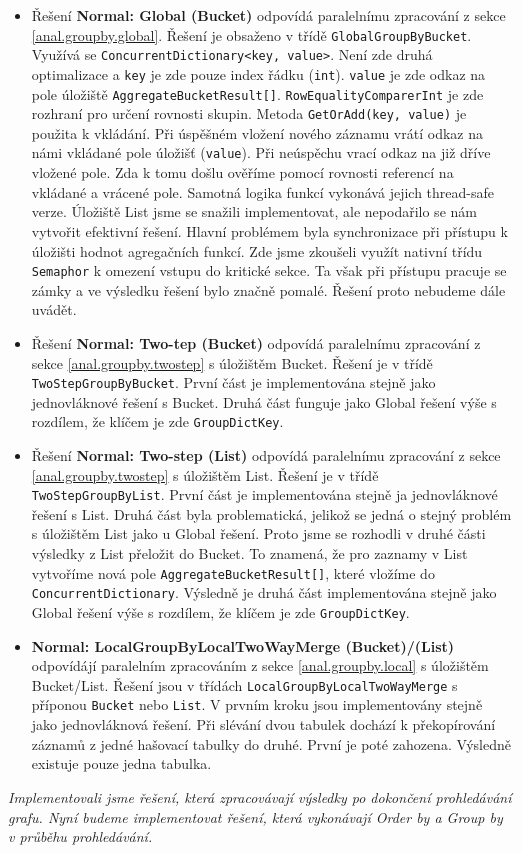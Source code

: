 \begin{itemize}
\item Řešení \textbf{Normal: Global (Bucket)} odpovídá paralelnímu zpracování z sekce \ref{anal.groupby.global}.
Řešení je obsaženo v třídě \texttt{GlobalGroupByBucket}.
Využívá se \texttt{ConcurrentDictionary<key, value>}.
Není zde druhá optimalizace a \texttt{key} je zde pouze index řádku (\texttt{int}). 
\texttt{value} je zde odkaz na pole úložiště \texttt{AggregateBucketResult[]}.
\texttt{RowEqualityComparerInt} je zde rozhraní pro určení rovnosti skupin.
Metoda \texttt{GetOrAdd(key, value)} je použita k vkládání.
Při úspěšném vložení nového záznamu vrátí odkaz na námi vkládané pole úložišť (\texttt{value}).
Při neúspěchu vrací odkaz na již dříve vložené pole.
Zda k tomu došlu ověříme pomocí rovnosti referencí na vkládané a vrácené pole. 
Samotná logika funkcí vykonává jejich thread-safe verze. 
Úložiště List jsme se snažili implementovat, ale nepodařilo se nám vytvořit efektivní řešení.
Hlavní problémem byla synchronizace při přístupu k úložišti hodnot agregačních funkcí.
Zde jsme zkoušeli využít nativní třídu \texttt{Semaphor} k omezení vstupu do kritické sekce.
Ta však při přístupu pracuje se zámky a ve výsledku řešení bylo značně pomalé.
Řešení proto nebudeme dále uvádět.

\item Řešení \textbf{Normal: Two-tep (Bucket)} odpovídá paralelnímu zpracování z sekce \ref{anal.groupby.twostep} s úložištěm Bucket.
Řešení je v třídě \texttt{TwoStepGroupByBucket}.
První část je implementována stejně jako jednovláknové řešení s Bucket.
Druhá část funguje jako Global řešení výše s rozdílem, že klíčem je zde \texttt{GroupDictKey}.

\item Řešení \textbf{Normal: Two-step (List) }odpovídá paralelnímu zpracování z sekce \ref{anal.groupby.twostep} s úložištěm List.
Řešení je v třídě \texttt{TwoStepGroupByList}.
První část je implementována stejně ja jednovláknové řešení s List.
Druhá část byla problematická, jelikož se jedná o stejný problém s úložištěm List jako u Global řešení.
Proto jsme se rozhodli v druhé části výsledky z List přeložit do Bucket.
To znamená, že pro zaznamy v List vytvoříme nová pole \texttt{AggregateBucketResult[]}, které vložíme do \texttt{ConcurrentDictionary}.
Výsledně je druhá část implementována stejně jako Global řešení výše s rozdílem, že klíčem je zde \texttt{GroupDictKey}.

\item \textbf{Normal: LocalGroupByLocalTwoWayMerge (Bucket)}\textbf{/(List)} odpovídájí paralelním zpracováním z sekce \ref{anal.groupby.local} s úložištěm Bucket/List.
Řešení jsou v třídách \texttt{LocalGroupByLocalTwoWayMerge} s příponou \texttt{Bucket} nebo \texttt{List}.
V prvním kroku jsou implementovány stejně jako jednovláknová řešení.
Při slévání dvou tabulek dochází k překopírování záznamů z jedné hašovací tabulky do druhé.
První je poté zahozena.
Výsledně existuje pouze jedna tabulka. 
\end{itemize}

\textit{Implementovali jsme řešení, která zpracovávají výsledky po dokončení prohledávání grafu.
Nyní budeme implementovat řešení, která vykonávají Order by a Group by v průběhu prohledávání.}



